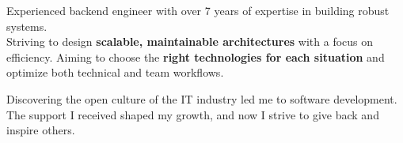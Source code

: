 

\begin{cvparagraph}


Experienced backend engineer with over 7 years of expertise in building robust systems. \\
Striving to design \textbf{scalable, maintainable architectures} with a focus on efficiency. 
Aiming to choose the \textbf{right technologies for each situation} and optimize both technical and team workflows.

Discovering the open culture of the IT industry led me to software development. 
The support I received shaped my growth, and now I strive to give back and inspire others.

\end{cvparagraph}
